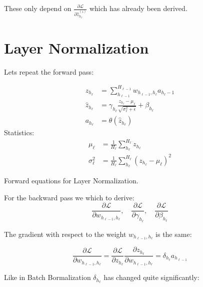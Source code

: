 These only depend on $\frac{\partial \mathcal{L}}{\partial \hat{z}_{h_\ell}^{(i)}}$ which has already been derived.

\clearpage
\section{Layer Normalization}

Lets repeat the forward pass:
\begin{equationbox}[H]
\begin{equation*}
\begin{aligned}
z_{h_\ell} &= \sum_{h_{\ell-1}}^{H_{\ell-1}} w_{h_{\ell-1},h_\ell} a_{h_\ell-1} \\
\hat{z}_{h_\ell} &= \gamma_{h_\ell} \frac{z_{h_\ell} - \mu_{\ell}}{\sqrt{\sigma_{\ell}^2 + \epsilon}} + \beta_{h_\ell} \\
a_{h_\ell} &= \theta\left(\hat{z}_{h_\ell}\right)
\end{aligned}
\end{equation*}
Statistics:
\begin{equation*}
\begin{aligned}
\mu_{\ell} &= \frac{1}{H_\ell} \sum_{h_\ell}^{H_\ell} z_{h_\ell} \\
\sigma_{\ell}^2 &= \frac{1}{H_\ell} \sum_{h_\ell}^{H_\ell} (z_{h_\ell} - \mu_{\ell})^2
\end{aligned}
\end{equation*}
\caption{Forward equations for Layer Normalization.}
\end{equationbox}

For the backward pass we which to derive:
\begin{equation}
\frac{\partial \mathcal{L}}{\partial w_{h_{\ell-1},h_\ell}},\quad \frac{\partial \mathcal{L}}{\partial \gamma_{h_\ell}},\quad \frac{\partial \mathcal{L}}{\partial \beta_{h_\ell}}
\end{equation}

The gradient with respect to the weight $w_{h_{\ell-1},h_\ell}$ is the same:

\begin{equation}
\frac{\partial \mathcal{L}}{\partial w_{h_{\ell-1},h_\ell}} = \frac{\partial \mathcal{L}}{\partial z_{h_\ell}} \frac{\partial z_{h_\ell}}{\partial w_{h_{\ell-1},h_\ell}} = \delta_{h_\ell} a_{h_{\ell-1}}
\end{equation}

Like in Batch Bormalization $\delta_{h_\ell}$ has changed quite significantly:

